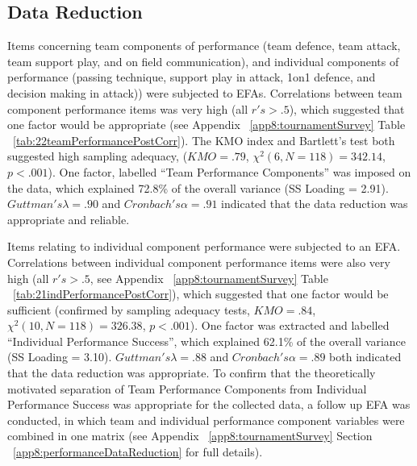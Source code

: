 \begin{CJK}{UTF8}{gbsn}
\clearpage


\begin{landscape}






\end{landscape}
\restoregeometry

\bigskip




\subsection{\label{Ch5:dataReduction}Data Reduction}


Items concerning team components of performance (team defence, team attack, team support play, and on field communication), and individual components of performance (passing technique, support play in attack, 1on1 defence, and decision making in attack)) were subjected to EFAs.  Correlations between team component performance items was very high (all $r's > .5$), which suggested that one factor would be appropriate (see Appendix ~\ref{app8:tournamentSurvey} Table ~\ref{tab:22teamPerformancePostCorr}). The KMO index and Bartlett's test both suggested high sampling adequacy, ($KMO = .79$, $\chi^2(6, N = 118) = 342.14$, $p < .001$).  One factor, labelled ``Team Performance Components'' was imposed on the data, which explained 72.8\% of the overall variance (SS Loading = 2.91). $Guttman's \lambda =.90$ and $Cronbach's\alpha = .91$ indicated that the data reduction was appropriate and reliable.

Items relating to individual component performance  were subjected to an EFA.  Correlations between individual component performance items were also very high (all $r's > .5$, see Appendix ~\ref{app8:tournamentSurvey} Table ~\ref{tab:21indPerformancePostCorr}), which suggested that one factor would be sufficient (confirmed by sampling adequacy tests, $KMO =  .84$, $\chi^2(10, N = 118) =  326.38$, $p < .001$).  One factor was extracted and labelled ``Individual Performance Success'', which explained 62.1\% of the overall variance (SS Loading = 3.10).
$Guttman's\lambda =.88$ and $Cronbach's \alpha = .89$ both indicated that the data reduction was appropriate.  To confirm that the theoretically motivated separation of Team Performance Components from Individual Performance Success was appropriate for the collected data, a follow up EFA was conducted, in which team and individual performance component variables were combined in one matrix (see Appendix ~\ref{app8:tournamentSurvey} Section ~\ref{app8:performanceDataReduction} for full details).


\end{CJK}
